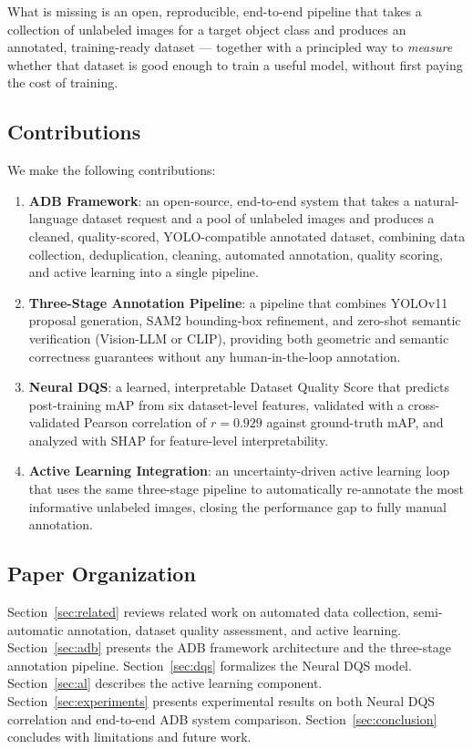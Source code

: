 \documentclass[11pt]{article}
\begin{document}
What is missing is an open, reproducible, end-to-end pipeline that takes a
collection of unlabeled images for a target object class and produces an
annotated, training-ready dataset --- together with a principled way to
\emph{measure} whether that dataset is good enough to train a useful model,
without first paying the cost of training.

\subsection{Contributions}

We make the following contributions:

\begin{enumerate}
\item \textbf{ADB Framework}: an open-source, end-to-end system that takes a
  natural-language dataset request and a pool of unlabeled images and
  produces a cleaned, quality-scored, YOLO-compatible annotated dataset,
  combining data collection, deduplication, cleaning, automated annotation,
  quality scoring, and active learning into a single pipeline.
\item \textbf{Three-Stage Annotation Pipeline}: a pipeline that combines
  YOLOv11 proposal generation, SAM2 bounding-box refinement, and zero-shot
  semantic verification (Vision-LLM or CLIP), providing both geometric and
  semantic correctness guarantees without any human-in-the-loop annotation.
\item \textbf{Neural DQS}: a learned, interpretable Dataset Quality Score
  that predicts post-training mAP from six dataset-level features, validated
  with a cross-validated Pearson correlation of $r=0.929$ against ground-truth
  mAP, and analyzed with SHAP for feature-level interpretability.
\item \textbf{Active Learning Integration}: an uncertainty-driven active
  learning loop that uses the same three-stage pipeline to automatically
  re-annotate the most informative unlabeled images, closing the performance
  gap to fully manual annotation.
\end{enumerate}

\subsection{Paper Organization}

Section~\ref{sec:related} reviews related work on automated data collection,
semi-automatic annotation, dataset quality assessment, and active learning.
Section~\ref{sec:adb} presents the ADB framework architecture and the
three-stage annotation pipeline. Section~\ref{sec:dqs} formalizes the Neural
DQS model. Section~\ref{sec:al} describes the active learning component.
Section~\ref{sec:experiments} presents experimental results on both Neural
DQS correlation and end-to-end ADB system comparison. Section~\ref{sec:conclusion}
concludes with limitations and future work.
\end{document}
